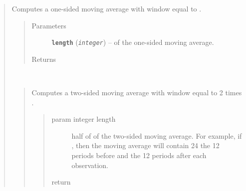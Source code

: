 \documentclass[letterpaper,10pt,english]{sphinxmanual}
\begin{document}
\begin{fulllineitems}
\begin{quote}
\begin{fulllineitems}
\begin{quote}
\begin{description}
\end{description}\end{quote}

\end{fulllineitems}


\begin{fulllineitems}
\label{series_class:fredpy.series.ma1side}
Computes a one-sided moving average with window equal to .
\begin{quote}\begin{description}
\item[{Parameters}] \leavevmode
\textbf{\texttt{length}} (\emph{\texttt{integer}}) --  of the one-sided moving average.

\item[{Returns}] \leavevmode
{\hyperref[series_class:fredpy.series]{}}

\end{description}\end{quote}

\end{fulllineitems}


\begin{fulllineitems}
\label{series_class:fredpy.series.ma2side}~\begin{quote}

Computes a two-sided moving average with window equal to 2 times .
\begin{quote}\begin{description}
\item[{param integer length}] \leavevmode
half of  of the two-sided moving average. For example, if , then the moving average will contain 24 the 12 periods before and the 12 periods after each observation.

\item[{return}] \leavevmode
{\hyperref[series_class:fredpy.series]{}}

\end{description}\end{quote}
\end{quote}


\end{fulllineitems}
\end{quote}
\end{fulllineitems}
\end{document}
